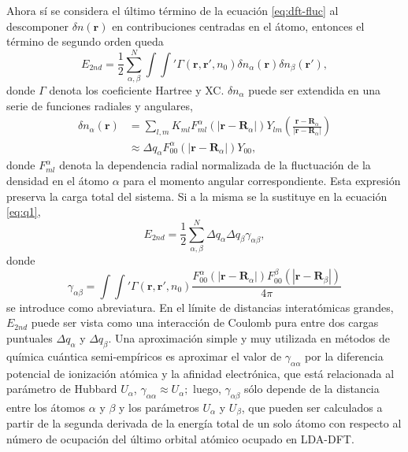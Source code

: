 \begin{enumerate}
        Ahora sí se considera el último término de la ecuación \ref{eq:dft-fluc}
        al descomponer $\delta n(\mathbf{r})$ en contribuciones centradas en el
        átomo, entonces el término de segundo orden queda
        \begin{equation}\label{eq:q1}
        E_{2nd} = \frac{1}{2} \sum_{\alpha, \beta}^N \int \int' \Gamma(\mathbf{r}, \mathbf{r}', n_0) \delta n_{\alpha}(\mathbf{r}) \delta n_{\beta}(\mathbf{r}'),
        \end{equation}
        donde $\Gamma$ denota los coeficiente Hartree y XC. $\delta n_{\alpha}$
        puede ser extendida en una serie de funciones radiales y angulares,
        \begin{equation*}
            \begin{aligned}
                \delta n_{\alpha}(\mathbf{r}) &= \sum_{l,m} K_{ml} F_{ml}^{\alpha}(|\mathbf{r} - \mathbf{R}_{\alpha}|) Y_{lm} \left(\frac{\mathbf{r}-\mathbf{R}_{\alpha}}{|\mathbf{r}-\mathbf{R}_{\alpha}|}\right) \\
                &\approx \Delta q_{\alpha} F_{00}^{\alpha}(|\mathbf{r} - \mathbf{R}_{\alpha}|) Y_{00},
            \end{aligned}
        \end{equation*}
        donde $F_{ml}^{\alpha}$ denota la dependencia radial normalizada de la
        fluctuación de la densidad en el átomo $\alpha$ para el momento angular
        correspondiente. Esta expresión preserva la carga total del sistema.
        Si a la misma se la sustituye en la ecuación \ref{eq:q1},
        $$
        E_{2nd} = \frac{1}{2} \sum_{\alpha,\beta}^N \Delta q_{\alpha} \Delta q_{\beta} \gamma_{\alpha\beta},
        $$
        donde
        $$
        \gamma_{\alpha\beta} = \int \int' \Gamma(\mathbf{r},\mathbf{r}',n_0)\frac{F_{00}^{\alpha}(|\mathbf{r} - \mathbf{R}_{\alpha}|)F_{00}^{\beta}(|\mathbf{r} - \mathbf{R}_{\beta}|)}{4 \pi}
        $$
        se introduce como abreviatura. En el límite de distancias interatómicas
        grandes, $E_{2nd}$ puede ser vista como una interacción de Coulomb pura
        entre dos cargas puntuales $\Delta q_{\alpha}$ y $\Delta q_{\beta}$. Una
        aproximación simple y muy utilizada en métodos de química cuántica 
        semi-empíricos es aproximar el valor de $\gamma_{\alpha\alpha}$ por la 
        diferencia potencial de ionización atómica y la afinidad electrónica, que
        está relacionada al parámetro de Hubbard $U_{\alpha}$, 
        $\gamma_{\alpha\alpha} \approx U_{\alpha};$ luego, $\gamma_{\alpha\beta}$ 
        sólo depende de la distancia entre los átomos $\alpha$ y $\beta$ y los 
        parámetros $U_{\alpha}$ y $U_{\beta}$, que pueden ser calculados a partir 
        de la segunda derivada de la energía total de un solo átomo con respecto 
        al número de ocupación del último orbital atómico ocupado en LDA-DFT.


\end{enumerate}
